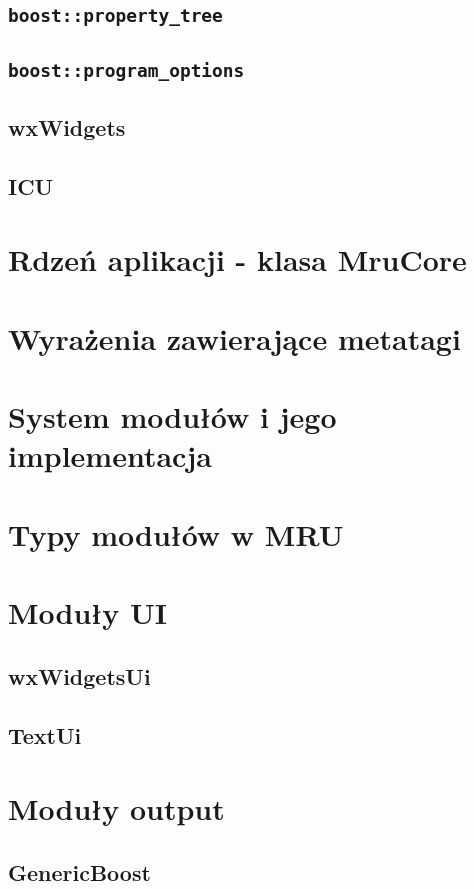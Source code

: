 \subsection{\texttt{boost::property\_tree}}

\subsection{\texttt{boost::program\_options}}
\subsection{wxWidgets}
\subsection{ICU}

\section{Rdzeń aplikacji - klasa MruCore}

\section{Wyrażenia zawierające metatagi}

\section{System modułów i jego implementacja}

\section{Typy modułów w MRU}

\section{Moduły UI}
\subsection{wxWidgetsUi}
\subsection{TextUi}

\section{Moduły output}
\subsection{GenericBoost}


